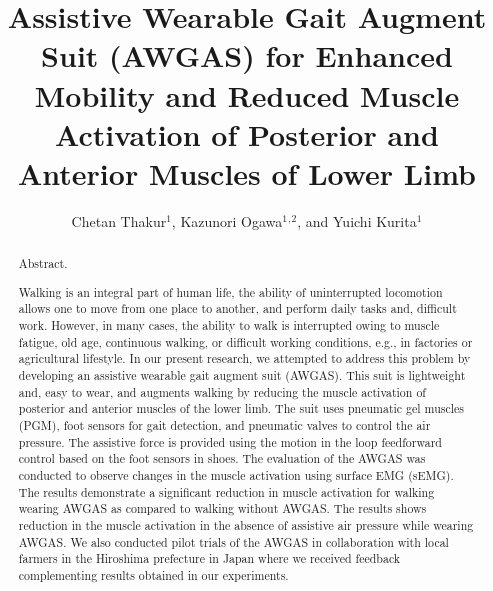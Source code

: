 \documentclass[paper,JRM,paper]{jaciiiarticle}
\begin{document}
\pagestyle{jaciiistyle}

\title{Assistive Wearable Gait Augment Suit (AWGAS) for Enhanced Mobility and Reduced Muscle Activation of Posterior and Anterior Muscles of Lower Limb}
\author{Chetan Thakur$^1$, Kazunori Ogawa$^1$$^,$$^2$, and Yuichi Kurita$^1$}
\address{$^1$Hiroshima University, Hiroshima, Japan\\
		 $^2$ Daiya Industries Co, Ltd. Okayama, Japan\\
         E-mail: chetanthakur@hiroshima-u.ac.jp}
\maketitle

\begin{abstract}%
\noindent Abstract. %

Walking is an integral part of human life, the ability of uninterrupted locomotion allows one to move from one place to another, and perform daily tasks and, difficult work. However, in many cases, the ability to walk is interrupted owing to muscle fatigue, old age, continuous walking, or difficult working conditions, e.g., in factories or agricultural lifestyle. In our present research, we attempted to address this problem by developing an assistive wearable gait augment suit (AWGAS). This suit is lightweight and, easy to wear, and augments walking by reducing the muscle activation of posterior and anterior muscles of the lower limb. The suit uses pneumatic gel muscles (PGM), foot sensors for gait detection, and pneumatic valves to control the air pressure. The assistive force is provided using the motion in the loop feedforward control based on the foot sensors in shoes. The evaluation of the AWGAS was conducted to observe changes in the muscle activation using surface EMG (sEMG). The results demonstrate a significant reduction in muscle activation for walking wearing AWGAS as compared to walking without AWGAS. The results shows reduction in the muscle activation in the absence of assistive air pressure while wearing AWGAS. We also conducted pilot trials of the AWGAS in collaboration with local farmers in the Hiroshima prefecture in Japan where we received feedback complementing results obtained in our experiments.  
\end{abstract}
\end{document}
